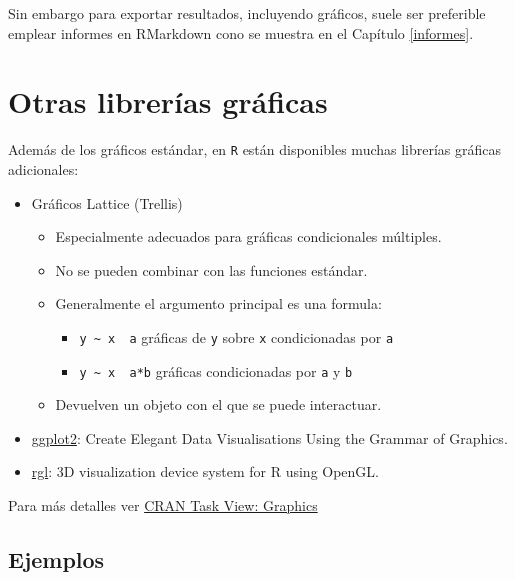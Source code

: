 \documentclass[
]{book}
\theoremstyle{break}
\theoremstyle{nonumberplain}
\begin{document}
Sin embargo para exportar resultados, incluyendo gráficos, suele ser preferible emplear informes en RMarkdown cono se muestra en el Capítulo \ref{informes}.

\hypertarget{otras-libreruxedas-gruxe1ficas}{%
\section{Otras librerías gráficas}\label{otras-libreruxedas-gruxe1ficas}}

Además de los gráficos estándar, en \texttt{R} están disponibles muchas librerías gráficas adicionales:

\begin{itemize}
\item
  Gráficos Lattice (Trellis)

  \begin{itemize}
  \item
    Especialmente adecuados para gráficas condicionales múltiples.
  \item
    No se pueden combinar con las funciones estándar.
  \item
    Generalmente el argumento principal es una formula:

    \begin{itemize}
    \item
      \texttt{y\ \textasciitilde{}\ x\ \textbar{}\ a} gráficas de \texttt{y} sobre \texttt{x} condicionadas por \texttt{a}
    \item
      \texttt{y\ \textasciitilde{}\ x\ \textbar{}\ a*b} gráficas condicionadas por \texttt{a} y \texttt{b}
    \end{itemize}
  \item
    Devuelven un objeto con el que se puede interactuar.
  \end{itemize}
\item
  \href{https://ggplot2.tidyverse.org}{ggplot2}: Create Elegant Data Visualisations Using the Grammar of Graphics.
\item
  \href{https://dmurdoch.github.io/rgl}{rgl}: 3D visualization device system for R using OpenGL.
\end{itemize}

Para más detalles ver \href{http://cran.r-project.org/web/views/Graphics.html}{CRAN Task View: Graphics}

\hypertarget{ejemplos-2}{%
\subsection{Ejemplos}\label{ejemplos-2}}
\end{document}
